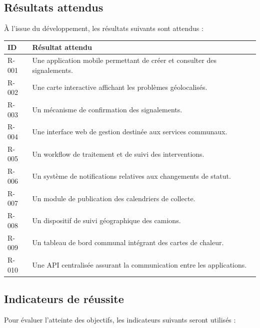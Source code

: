 \documentclass[11pt,a4paper,oneside]{report}
\begin{document}
	\subsection{Résultats attendus}
	
	À l'issue du développement, les résultats suivants
	sont attendus :
	
	\begin{table}[h!]
		\centering
		\small
		\renewcommand{\arraystretch}{1.15}
		\begin{tabular}{|p{1.5cm}|p{12.5cm}|}
			\hline
			\textbf{ID} & \textbf{Résultat attendu} \\ \hline
			R-001 & Une application mobile permettant de créer et consulter des signalements. \\ \hline
			R-002 & Une carte interactive affichant les problèmes géolocalisés. \\ \hline
			R-003 & Un mécanisme de confirmation des signalements. \\ \hline
			R-004 & Une interface web de gestion destinée aux services communaux. \\ \hline
			R-005 & Un workflow de traitement et de suivi des interventions. \\ \hline
			R-006 & Un système de notifications relatives aux changements de statut. \\ \hline
			R-007 & Un module de publication des calendriers de collecte. \\ \hline
			R-008 & Un dispositif de suivi géographique des camions. \\ \hline
			R-009 & Un tableau de bord communal intégrant des cartes de chaleur. \\ \hline
			R-010 & Une API centralisée assurant la communication entre les applications. \\ \hline
		\end{tabular}
	\end{table}
	
	\subsection{Indicateurs de réussite}
	
	Pour évaluer l'atteinte des objectifs, les indicateurs
	suivants seront utilisés :
	
\end{document}
